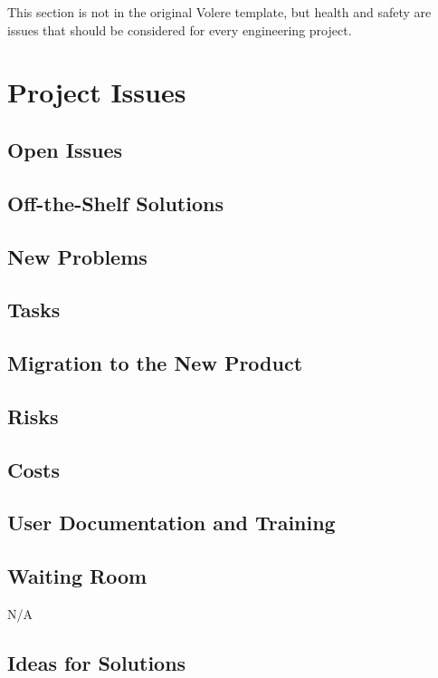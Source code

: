 \documentclass[12pt, titlepage]{article}
\begin{document}
This section is not in the original Volere template, but health and safety are
issues that should be considered for every engineering project.

\section{Project Issues}

\subsection{Open Issues}

\subsection{Off-the-Shelf Solutions}

\subsection{New Problems}

\subsection{Tasks}

\subsection{Migration to the New Product}

\subsection{Risks}

\subsection{Costs}

\subsection{User Documentation and Training}

\subsection{Waiting Room}

N/A

\subsection{Ideas for Solutions}
\end{document}
